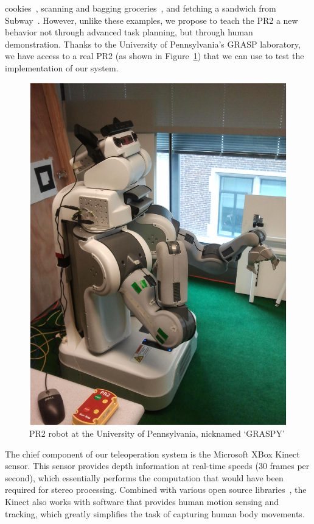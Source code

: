 \documentclass{sig-alternate}
\begin{document}
cookies~\cite{cookies}, scanning and bagging groceries~\cite{groceries}, and fetching a sandwich from 
Subway~\cite{subway}. However, unlike these examples, we propose to teach the PR2 a new behavior not through advanced task planning, but through human
demonstration. Thanks to the University of Pennsylvania's GRASP laboratory, we have access to a real PR2 (as shown in Figure~\ref{fig:pr2_photo}) that we can use to test the implementation of our system.\\
\begin{figure}[htb] 
	\begin{center}
		\includegraphics[width=0.75\linewidth]{graspy}
	\end{center}
	\caption{PR2 robot at the University of Pennsylvania, nicknamed `GRASPY'}
	\label{fig:pr2_photo}
\end{figure}
\indent The chief component of our teleoperation system is the Microsoft XBox Kinect sensor. This sensor provides depth information at real-time speeds
(30 frames per second), which essentially performs the computation that would have been required for stereo 
processing. Combined with various open source libraries~\cite{kinect}, the Kinect also works with 
software that provides human motion sensing and tracking, which greatly simplifies the task of capturing human body movements.
\end{document}
